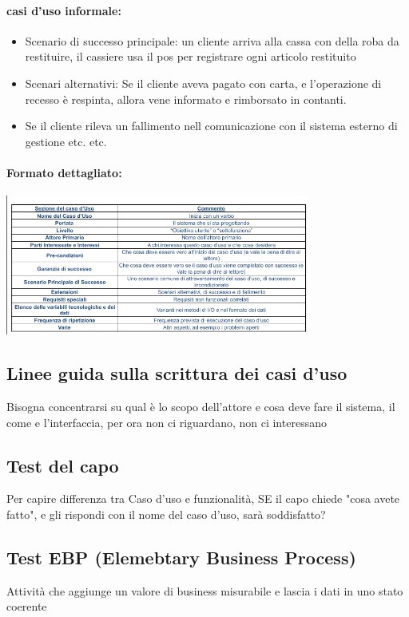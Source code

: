 \documentclass[12pt, a4paper, openany, twoside]{book}
\begin{document}
\paragraph{casi d'uso informale:}
\begin{itemize}
	\item Scenario di successo principale: un cliente arriva alla cassa con della
	roba da restituire, il cassiere usa il pos per registrare ogni articolo
	restituito
	\item Scenari alternativi: Se il cliente aveva pagato con carta, e l'operazione
	di recesso è respinta, allora vene informato e rimborsato in contanti.
	\item Se il cliente rileva un fallimento nell comunicazione con il sistema
	esterno di gestione etc. etc.
\end{itemize}
\paragraph{Formato dettagliato:}
\begin{center}
\includegraphics[width=0.75\textwidth]{2}
\end{center}
\subsection{Linee guida sulla scrittura dei casi d'uso}
Bisogna concentrarsi su qual è lo scopo dell'attore e cosa deve fare il sistema,
il come e l'interfaccia, per ora non ci riguardano, non ci interessano
\subsection{Test del capo}
Per capire differenza tra Caso d'uso e funzionalità, SE il capo chiede "cosa 
avete fatto", e gli rispondi con il nome del caso d'uso, sarà soddisfatto?
\subsection{Test EBP (Elemebtary Business Process)}
Attività che aggiunge un valore di business misurabile e lascia i dati in uno 
stato coerente
\end{document}
